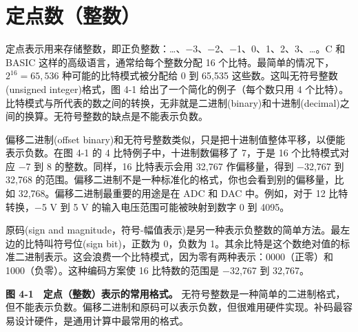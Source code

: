 \section{定点数（整数）}

定点表示用来存储整数，即正负整数：\ldots、−3、−2、−1、0、1、2、3、\ldots。C
和 BASIC 这样的高级语言，通常给每个整数分配 16
个比特。最简单的情况下，\(2^{16} = 65,536\) 种可能的比特模式被分配给 0
到 65,535 这些数。这叫无符号整数(unsigned integer)格式，图 4-1
给出了一个简化的例子（每个数只用 4
个比特）。比特模式与所代表的数之间的转换，无非就是二进制(binary)和十进制(decimal)之间的换算。无符号整数的缺点是不能表示负数。

偏移二进制(offset
binary)和无符号整数类似，只是把十进制值整体平移，以便能表示负数。在图
4-1 的 4 比特例子中，十进制数偏移了 7，于是 16 个比特模式对应 −7 到 8
的整数。同样，16 比特表示会用 32,767 作偏移量，得到 −32,767 到 32,768
的范围。偏移二进制不是一种标准化的格式，你也会看到别的偏移量，比如
32,768。偏移二进制最重要的用途是在 ADC 和 DAC 中。例如，对于 12
比特转换，−5 V 到 5 V 的输入电压范围可能被映射到数字 0 到 4095。

原码(sign and
magnitude，符号-幅值表示)是另一种表示负整数的简单方法。最左边的比特叫符号位(sign
bit)，正数为 0，负数为
1。其余比特是这个数绝对值的标准二进制表示。这会浪费一个比特模式，因为零有两种表示：0000（正零）和
1000（负零）。这种编码方案使 16 比特数的范围是 −32,767 到 32,767。

\textbf{图 4-1　定点（整数）表示的常用格式。}
无符号整数是一种简单的二进制格式，但不能表示负数。偏移二进制和原码可以表示负数，但很难用硬件实现。补码最容易设计硬件，是通用计算中最常用的格式。

